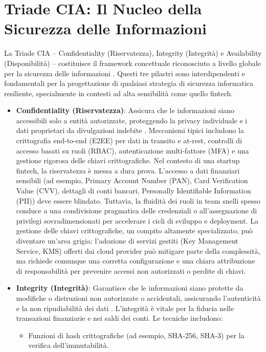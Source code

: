 \section{Triade CIA: Il Nucleo della Sicurezza delle Informazioni}
La Triade CIA – Confidentiality (Riservatezza), Integrity (Integrità) e Availability (Disponibilità) – costituisce il framework concettuale riconosciuto a livello globale per la sicurezza delle informazioni \cite{NIST_SP_1800_26}. Questi tre pilastri sono interdipendenti e fondamentali per la progettazione di qualsiasi strategia di sicurezza informatica resiliente, specialmente in contesti ad alta sensibilità come quello fintech.
\begin{itemize}
\item \textbf{Confidentiality (Riservatezza)}: Assicura che le informazioni siano accessibili solo a entità autorizzate, proteggendo la privacy individuale e i dati proprietari da divulgazioni indebite \cite{NIST_SP_1800_26}. Meccanismi tipici includono la crittografia end-to-end (E2EE) per dati in transito e at-rest, controlli di accesso basati su ruoli (RBAC), autenticazione multi-fattore (MFA) e una gestione rigorosa delle chiavi crittografiche.
Nel contesto di una startup fintech, la riservatezza è messa a dura prova. L'accesso a dati finanziari sensibili (ad esempio, Primary Account Number (PAN), Card Verification Value (CVV), dettagli di conti bancari, Personally Identifiable Information (PII)) deve essere blindato. Tuttavia, la fluidità dei ruoli in team snelli spesso conduce a una condivisione pragmatica delle credenziali o all'assegnazione di privilegi sovradimensionati per accelerare i cicli di sviluppo e deployment. La gestione delle chiavi crittografiche, un compito altamente specializzato, può diventare un'area grigia: l'adozione di servizi gestiti (Key Management Service, KMS) offerti dai cloud provider può mitigare parte della complessità, ma richiede comunque una corretta configurazione e una chiara attribuzione di responsabilità per prevenire accessi non autorizzati o perdite di chiavi.
\item \textbf{Integrity (Integrità)}: Garantisce che le informazioni siano protette da modifiche o distruzioni non autorizzate o accidentali, assicurando l'autenticità e la non ripudiabilità dei dati \cite{NIST_SP_1800_26}. L'integrità è vitale per la fiducia nelle transazioni finanziarie e nei saldi dei conti. Le tecniche includono:
\begin{itemize}
\item Funzioni di hash crittografiche (ad esempio, SHA-256, SHA-3) per la verifica dell'immutabilità.

\end{itemize}
\end{itemize}
